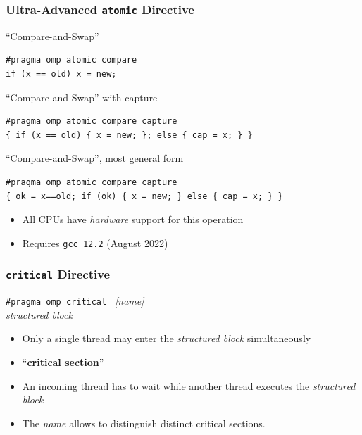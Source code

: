 \documentclass{beamer}
\begin{document}
\begin{frame}[fragile=singleslide]
  \frametitle{Ultra-Advanced \texttt{atomic} Directive}

  \begin{exampleblock}{``Compare-and-Swap''}
\vspace*{-2ex}
\begin{verbatim}
#pragma omp atomic compare
if (x == old) x = new; 
\end{verbatim}
  \end{exampleblock}

  \begin{block}{``Compare-and-Swap'' with capture}
\vspace*{-2ex}
\begin{verbatim}
#pragma omp atomic compare capture
{ if (x == old) { x = new; }; else { cap = x; } }
\end{verbatim}
  \end{block}
  
  \begin{alertblock}{``Compare-and-Swap'', most general form}
\vspace*{-2ex}
\begin{verbatim}
#pragma omp atomic compare capture 
{ ok = x==old; if (ok) { x = new; } else { cap = x; } }
\end{verbatim}
  \end{alertblock}

  \begin{itemize}
  \item All CPUs have \emph{hardware} support for this operation
  \item Requires \texttt{gcc 12.2} (August 2022)
  \end{itemize}
  
\end{frame}



\begin{frame}
  \frametitle{\texttt{critical} Directive} 

\begin{framed}
  {\tt \#pragma omp critical } {\it [name]}  \\
  {\it structured block} 
\end{framed}

\bigskip

\begin{itemize}
\item Only a single thread may enter the \textit{structured block} simultaneously

\item ``\textbf{critical section}''
    
\item An incoming thread has to wait while another thread executes the \textit{structured block}
  
\item The \textit{name} allows to distinguish distinct critical sections.
\end{itemize}
\end{frame}
\end{document}
